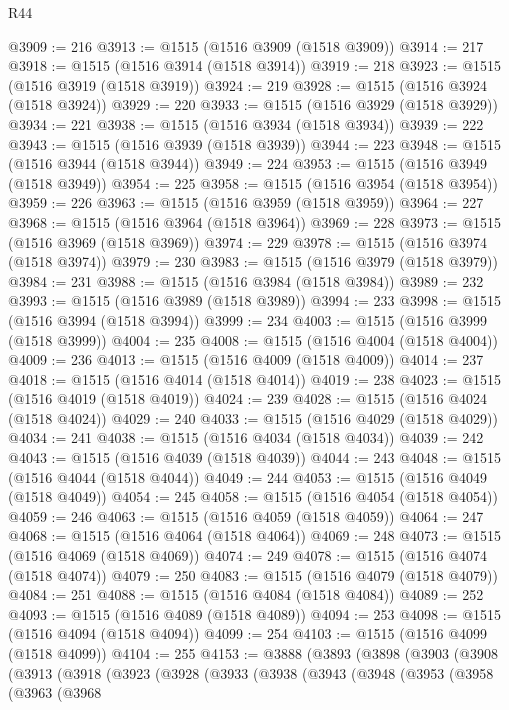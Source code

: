 \begin{lexlean}{R44}
\begin{coremodule}
{@3909 := 216
@3913 := @1515 (@1516 @3909 (@1518 @3909))
@3914 := 217
@3918 := @1515 (@1516 @3914 (@1518 @3914))
@3919 := 218
@3923 := @1515 (@1516 @3919 (@1518 @3919))
@3924 := 219
@3928 := @1515 (@1516 @3924 (@1518 @3924))
@3929 := 220
@3933 := @1515 (@1516 @3929 (@1518 @3929))
@3934 := 221
@3938 := @1515 (@1516 @3934 (@1518 @3934))
@3939 := 222
@3943 := @1515 (@1516 @3939 (@1518 @3939))
@3944 := 223
@3948 := @1515 (@1516 @3944 (@1518 @3944))
@3949 := 224
@3953 := @1515 (@1516 @3949 (@1518 @3949))
@3954 := 225
@3958 := @1515 (@1516 @3954 (@1518 @3954))
@3959 := 226
@3963 := @1515 (@1516 @3959 (@1518 @3959))
@3964 := 227
@3968 := @1515 (@1516 @3964 (@1518 @3964))
@3969 := 228
@3973 := @1515 (@1516 @3969 (@1518 @3969))
@3974 := 229
@3978 := @1515 (@1516 @3974 (@1518 @3974))
@3979 := 230
@3983 := @1515 (@1516 @3979 (@1518 @3979))
@3984 := 231
@3988 := @1515 (@1516 @3984 (@1518 @3984))
@3989 := 232
@3993 := @1515 (@1516 @3989 (@1518 @3989))
@3994 := 233
@3998 := @1515 (@1516 @3994 (@1518 @3994))
@3999 := 234
@4003 := @1515 (@1516 @3999 (@1518 @3999))
@4004 := 235
@4008 := @1515 (@1516 @4004 (@1518 @4004))
@4009 := 236
@4013 := @1515 (@1516 @4009 (@1518 @4009))
@4014 := 237
@4018 := @1515 (@1516 @4014 (@1518 @4014))
@4019 := 238
@4023 := @1515 (@1516 @4019 (@1518 @4019))
@4024 := 239
@4028 := @1515 (@1516 @4024 (@1518 @4024))
@4029 := 240
@4033 := @1515 (@1516 @4029 (@1518 @4029))
@4034 := 241
@4038 := @1515 (@1516 @4034 (@1518 @4034))
@4039 := 242
@4043 := @1515 (@1516 @4039 (@1518 @4039))
@4044 := 243
@4048 := @1515 (@1516 @4044 (@1518 @4044))
@4049 := 244
@4053 := @1515 (@1516 @4049 (@1518 @4049))
@4054 := 245
@4058 := @1515 (@1516 @4054 (@1518 @4054))
@4059 := 246
@4063 := @1515 (@1516 @4059 (@1518 @4059))
@4064 := 247
@4068 := @1515 (@1516 @4064 (@1518 @4064))
@4069 := 248
@4073 := @1515 (@1516 @4069 (@1518 @4069))
@4074 := 249
@4078 := @1515 (@1516 @4074 (@1518 @4074))
@4079 := 250
@4083 := @1515 (@1516 @4079 (@1518 @4079))
@4084 := 251
@4088 := @1515 (@1516 @4084 (@1518 @4084))
@4089 := 252
@4093 := @1515 (@1516 @4089 (@1518 @4089))
@4094 := 253
@4098 := @1515 (@1516 @4094 (@1518 @4094))
@4099 := 254
@4103 := @1515 (@1516 @4099 (@1518 @4099))
@4104 := 255
@4153 := @3888
    (@3893
      (@3898
        (@3903
          (@3908
            (@3913
              (@3918
                (@3923
                  (@3928
                    (@3933
                      (@3938
                        (@3943
                          (@3948
                            (@3953
                              (@3958
                                (@3963
                                  (@3968
}
\end{coremodule}
\end{lexlean}
